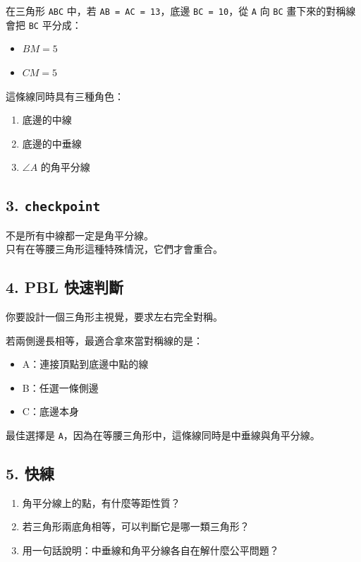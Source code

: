 \documentclass[
  chinese,
  12pt,
  a4paper,
  oneside]{article}
\providecommand{\tightlist}{%
  \setlength{\itemsep}{0pt}\setlength{\parskip}{0pt}}
\begin{document}
在三角形 \texttt{ABC} 中，若 \texttt{AB\ =\ AC\ =\ 13}，底邊
\texttt{BC\ =\ 10}，從 \texttt{A} 向 \texttt{BC} 畫下來的對稱線會把
\texttt{BC} 平分成：

\begin{itemize}
\tightlist
\item
  \(BM = 5\)
\item
  \(CM = 5\)
\end{itemize}

這條線同時具有三種角色：

\begin{enumerate}
\def\labelenumi{\arabic{enumi}.}
\tightlist
\item
  底邊的中線
\item
  底邊的中垂線
\item
  \(\angle A\) 的角平分線
\end{enumerate}

\subsection{\texorpdfstring{3.
\texttt{checkpoint}}{3. checkpoint}}\label{checkpoint-6}

不是所有中線都一定是角平分線。\\
只有在等腰三角形這種特殊情況，它們才會重合。

\subsection{4. PBL 快速判斷}\label{pbl-ux5febux901fux5224ux65b7-2}

你要設計一個三角形主視覺，要求左右完全對稱。

若兩側邊長相等，最適合拿來當對稱線的是：

\begin{itemize}
\tightlist
\item
  A：連接頂點到底邊中點的線
\item
  B：任選一條側邊
\item
  C：底邊本身
\end{itemize}

最佳選擇是
\texttt{A}，因為在等腰三角形中，這條線同時是中垂線與角平分線。

\subsection{5. 快練}\label{ux5febux7df4-2}

\begin{enumerate}
\def\labelenumi{\arabic{enumi}.}
\tightlist
\item
  角平分線上的點，有什麼等距性質？
\item
  若三角形兩底角相等，可以判斷它是哪一類三角形？
\item
  用一句話說明：中垂線和角平分線各自在解什麼公平問題？
\end{enumerate}
\end{document}
